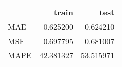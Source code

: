 \begin{tabular}{lrr}
\toprule
{} &      train &       test \\
\midrule
MAE  &   0.625200 &   0.624210 \\
MSE  &   0.697795 &   0.681007 \\
MAPE &  42.381327 &  53.515971 \\
\bottomrule
\end{tabular}
